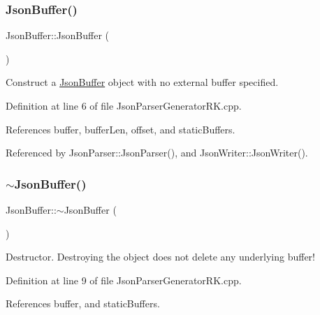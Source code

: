 \subsubsection{\texorpdfstring{Json\+Buffer()}{JsonBuffer()}\hspace{0.1cm}{\footnotesize\ttfamily [1/2]}}
{\footnotesize\ttfamily Json\+Buffer\+::\+Json\+Buffer (\begin{DoxyParamCaption}{ }\end{DoxyParamCaption})}



Construct a \hyperlink{class_json_buffer}{Json\+Buffer} object with no external buffer specified. 



Definition at line 6 of file Json\+Parser\+Generator\+R\+K.\+cpp.



References buffer, buffer\+Len, offset, and static\+Buffers.



Referenced by Json\+Parser\+::\+Json\+Parser(), and Json\+Writer\+::\+Json\+Writer().

\mbox{\label{class_json_buffer_a634ecf551d2d738b7a80b513e2c5a468}} 
\subsubsection{\texorpdfstring{$\sim$\+Json\+Buffer()}{~JsonBuffer()}}
{\footnotesize\ttfamily Json\+Buffer\+::$\sim$\+Json\+Buffer (\begin{DoxyParamCaption}{ }\end{DoxyParamCaption})\hspace{0.3cm}{\ttfamily [virtual]}}



Destructor. Destroying the object does not delete any underlying buffer! 



Definition at line 9 of file Json\+Parser\+Generator\+R\+K.\+cpp.



References buffer, and static\+Buffers.

\mbox{\label{class_json_buffer_a645819ad48ee172c01a482bef9c1f765}} 
